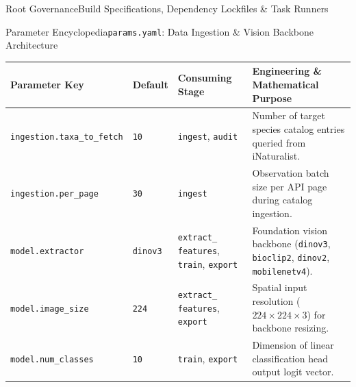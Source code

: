 \begin{frame}{Root Governance}{Build Specifications, Dependency Lockfiles \& Task Runners}
\end{frame}

\begin{frame}{Parameter Encyclopedia}{\texttt{params.yaml}: Data Ingestion \& Vision Backbone Architecture}
    \vspace{-0.15cm}
    \begin{center}\scriptsize\renewcommand{\arraystretch}{0.88}
        \begin{tabular}{>{\raggedright\arraybackslash}p{3.4cm} >{\centering\arraybackslash}p{1.0cm} >{\raggedright\arraybackslash}p{2.2cm} >{\raggedright\arraybackslash}p{4.8cm}}
            \toprule
            \textbf{Parameter Key} & \textbf{Default} & \textbf{Consuming Stage} & \textbf{Engineering \& Mathematical Purpose} \\
            \midrule
            \texttt{ingestion.taxa\_to\_fetch} & \texttt{10} & \texttt{ingest}, \texttt{audit} & Number of target species catalog entries queried from iNaturalist. \\
            \texttt{ingestion.per\_page} & \texttt{30} & \texttt{ingest} & Observation batch size per API page during catalog ingestion. \\
            \texttt{model.extractor} & \texttt{dinov3} & \texttt{extract\_} \newline \texttt{features}, \newline \texttt{train}, \texttt{export} & Foundation vision backbone (\texttt{dinov3}, \texttt{bioclip2}, \texttt{dinov2}, \texttt{mobilenetv4}). \\
            \texttt{model.image\_size} & \texttt{224} & \texttt{extract\_} \newline \texttt{features}, \newline \texttt{export} & Spatial input resolution ($224 \times 224 \times 3$) for backbone resizing. \\
            \texttt{model.num\_classes} & \texttt{10} & \texttt{train}, \texttt{export} & Dimension of linear classification head output logit vector. \\
            \bottomrule
        \end{tabular}
    \end{center}


\end{frame}

